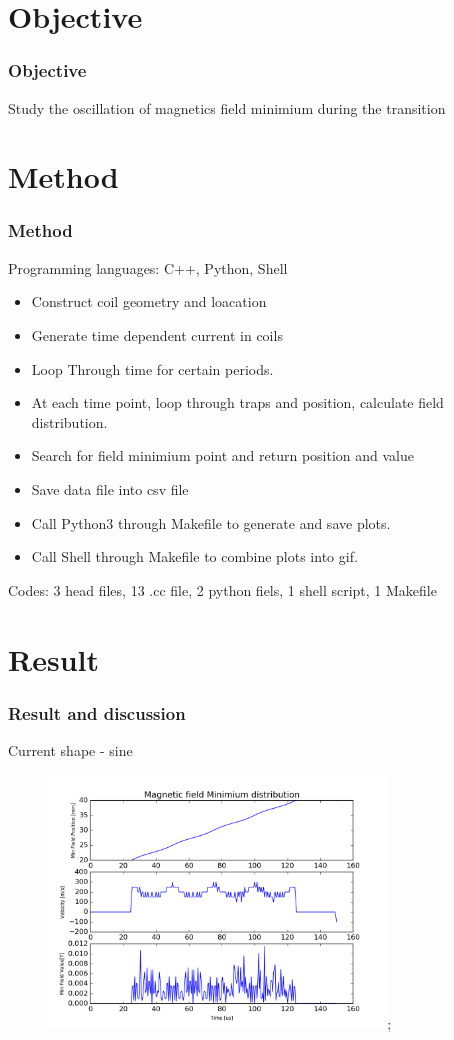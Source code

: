 \documentclass[10pt, xcolor=dvipsnames]{beamer}
\begin{document}
\section{Objective}
\begin{frame}
  \frametitle{Objective}
  Study the oscillation of magnetics field minimium during the transition
\end{frame}

\section{Method}
\begin{frame}
  \frametitle{Method}
  Programming languages: C++, Python, Shell \\[3mm]
  \begin{itemize}
  \item Construct coil geometry and loacation
  \item Generate time dependent current in coils
  \item Loop Through time for certain periods.
  \item At each time point, loop through traps and position, calculate field distribution.
  \item Search for field minimium point and return position and value
  \item Save data file into csv file
  \item Call Python3 through Makefile to generate and save plots.
  \item Call Shell through Makefile to combine plots into gif. 
  \end{itemize}
  \vspace{3mm}
  Codes: 3 head files, 13 .cc file, 2 python fiels, 1 shell script, 1 Makefile
\end{frame}

\section{Result}
\begin{frame}
  \frametitle{Result and discussion}
  Current shape - sine\\
  \begin{figure} 
    \includegraphics[width = 0.8\textwidth]{sine_toverlap_5};
  \end{figure}
\end{frame}
\end{document}
